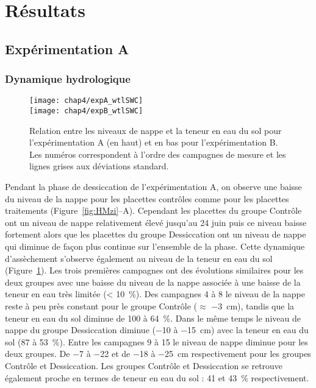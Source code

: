 \section{Résultats}

\subsection{Expérimentation A}

\subsubsection{Dynamique hydrologique}

\begin{figure}
\centering
\texttt{[image: chap4/expA\_wtlSWC]}\\
\texttt{[image: chap4/expB\_wtlSWC]}
\caption{Relation entre les niveaux de nappe et la teneur en eau du sol pour l'expérimentation A (en haut) et en bas pour l'expérimentation B. Les numéros correspondent à l'ordre des campagnes de mesure et les lignes grises aux déviations standard.}
\label{fig:wtlSWC}
\end{figure}

Pendant la phase de dessiccation de l'expérimentation A, on observe une baisse du niveau de la nappe pour les placettes contrôles comme pour les placettes traitements (Figure~\ref{fig:HMzi}--A).
Cependant les placettes du groupe Contrôle ont un niveau de nappe relativement élevé jusqu'au 24 juin puis ce niveau baisse fortement alors que les placettes du groupe Dessiccation ont un niveau de nappe qui diminue de façon plus continue sur l'ensemble de la phase.
Cette dynamique d'assèchement s'observe également au niveau de la teneur en eau du sol (Figure~\ref{fig:wtlSWC}).
Les trois premières campagnes ont des évolutions similaires pour les deux groupes avec une baisse du niveau de la nappe associée à une baisse de la teneur en eau très limitée (< \SI{10}{\percent}).
Des campagnes 4 à 8 le niveau de la nappe reste à peu près constant pour le groupe Contrôle ($\approx$ \SI{-3}{\centi\metre}), tandis que la teneur en eau du sol diminue de 100 à \SI{64}{\percent}.
Dans le même temps le niveau de nappe du groupe Dessiccation diminue (\num{-10} à \SI{-15}{\centi\metre}) avec la teneur en eau du sol (87 à \SI{53}{\percent}).
Entre les campagnes 9 à 15 le niveau de nappe diminue pour les deux groupes.
De \num{-7} à \num{-22} et de \num{-18} à \SI{-25}{\centi\metre} respectivement pour les groupes Contrôle et Dessiccation.
Les groupes Contrôle et Dessiccation se retrouve également proche en termes de teneur en eau du sol : 41 et \SI{43}{\percent} respectivement.

